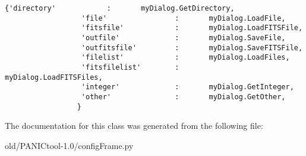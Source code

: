 \begin{Code}\begin{verbatim}{'directory'            :       myDialog.GetDirectory,
                  'file'                :       myDialog.LoadFile,
                  'fitsfile'            :       myDialog.LoadFITSFile,
                  'outfile'             :       myDialog.SaveFile,
                  'outfitsfile'         :       myDialog.SaveFITSFile,
                  'filelist'            :       myDialog.LoadFiles,
                  'fitsfilelist'        :       myDialog.LoadFITSFiles,
                  'integer'             :       myDialog.GetInteger,
                  'other'               :       myDialog.GetOther,
                 }
\end{verbatim}\end{Code}


The documentation for this class was generated from the following file:\begin{CompactItemize}
\item 
old/PANICtool-1.0/config\-Frame.py\end{CompactItemize}

